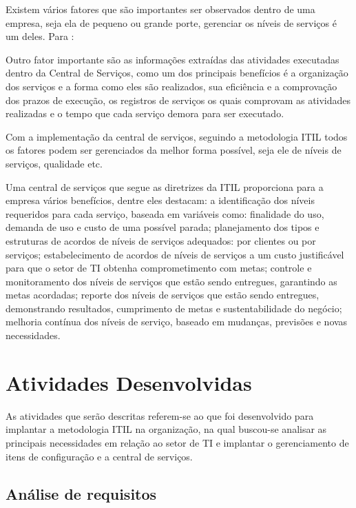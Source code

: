 \documentclass[eso]{bcc}
\begin{document}
Existem vários fatores que são importantes ser observados dentro de uma empresa, seja ela de pequeno ou grande porte, gerenciar os níveis de serviços é um deles. Para \cite[p. 83]{scremin:2015}:
\begin{quoting}
{\footnotesize
 Outro fator importante são as informações extraídas das atividades executadas dentro da Central de Serviços, como um dos principais benefícios é a organização dos serviços e a forma como eles são realizados, sua eficiência e a comprovação dos prazos de execução, os registros de serviços os quais comprovam as atividades realizadas e o tempo que cada serviço demora para ser executado.
 }
\end{quoting}

Com a implementação da central de serviços, seguindo a metodologia ITIL todos os fatores podem ser gerenciados da melhor forma possível, seja ele de níveis de serviços, qualidade etc.

Uma central de serviços que segue as diretrizes da ITIL proporciona para a empresa vários benefícios, dentre eles destacam: a identificação dos níveis requeridos para cada serviço, baseada em variáveis como: finalidade do uso, demanda de uso e custo de uma possível parada; planejamento dos tipos e estruturas de acordos de níveis de serviços adequados: por clientes ou por serviços; estabelecimento de acordos de níveis de serviços a um custo justificável para que o setor de TI obtenha comprometimento com metas; controle e monitoramento dos níveis de serviços que estão sendo entregues, garantindo as metas acordadas; reporte dos níveis de serviços que estão sendo entregues, demonstrando resultados, cumprimento de metas e sustentabilidade do negócio; melhoria contínua dos níveis de serviço, baseado em mudanças, previsões e novas necessidades.

\chapter{Atividades Desenvolvidas}
\label{chap:atividades}

As atividades que serão descritas referem-se ao que foi desenvolvido para implantar a metodologia ITIL na organização, na qual buscou-se  analisar as principais necessidades em relação ao setor de TI e implantar o gerenciamento de itens de configuração e a central  de serviços.

\section{Análise de requisitos}
\end{document}
